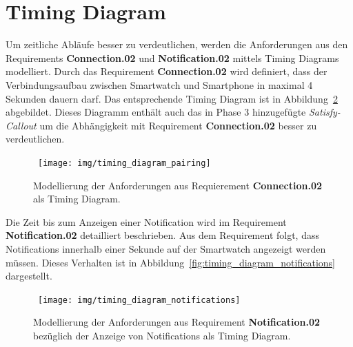 \section{Timing Diagram}
Um zeitliche Abläufe besser zu verdeutlichen, werden die Anforderungen aus den Requirements \textbf{Connection.02} und \textbf{Notification.02} mittels Timing Diagrams modelliert. Durch das Requirement \textbf{Connection.02} wird definiert, dass der Verbindungsaufbau zwischen Smartwatch und Smartphone in maximal 4 Sekunden dauern darf. Das entsprechende Timing Diagram ist in Abbildung~\ref{fig:timing_diagram_pairing} abgebildet. Dieses Diagramm enthält auch das in Phase 3 hinzugefügte \textit{Satisfy-Callout} um die Abhängigkeit mit Requirement \textbf{Connection.02} besser zu verdeutlichen.

\begin{figure}[H]
\centering\
\texttt{[image: img/timing\_diagram\_pairing]}
\caption[Timing Diagram: Pairing]{Modellierung der Anforderungen aus Requierement \textbf{Connection.02} als Timing Diagram. }
\label{fig:timing_diagram_pairing}
\end{figure}

Die Zeit bis zum Anzeigen einer \gls{Notification} wird im Requirement \textbf{Notification.02} detailliert beschrieben. Aus dem Requirement folgt, dass \glspl{Notification} innerhalb einer Sekunde auf der Smartwatch angezeigt werden müssen. Dieses Verhalten ist in Abbildung~\ref{fig:timing_diagram_notifications} dargestellt.

\begin{figure}[H]
\centering\
\texttt{[image: img/timing\_diagram\_notifications]}
\caption[Timing Diagram: Notifications]{Modellierung der Anforderungen aus Requirement \textbf{Notification.02} bezüglich der Anzeige von \glspl{Notification} als Timing Diagram.}
\label{fig:timing_diagram_pairing}
\end{figure}
